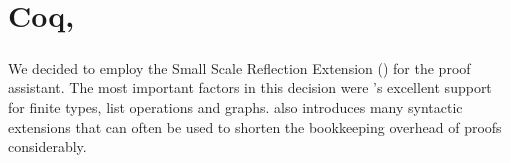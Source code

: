 \chapter{Coq, \ssreflect}

\paragraph{}
We decided to employ the Small Scale Reflection Extension (\textbf{\ssreflect}) for the \textbf{\coq} proof assistant. 
The most important factors in this decision were \ssreflect's excellent support for finite types, list operations and graphs. \ssreflect{} also introduces many syntactic extensions that can often be used to shorten the bookkeeping overhead of proofs considerably.

